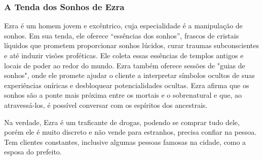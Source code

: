 



\subsubsection{A Tenda dos Sonhos de Ezra}

Ezra é um homem jovem e excêntrico, cuja especialidade é a manipulação de sonhos. Em sua tenda, ele oferece “essências dos sonhos”, frascos de cristais líquidos que prometem proporcionar sonhos lúcidos, curar traumas subconscientes e até induzir visões proféticas. Ele coleta essas essências de templos antigos e locais de poder ao redor do mundo. Ezra também oferece sessões de "guias de sonhos", onde ele promete ajudar o cliente a interpretar símbolos ocultos de suas experiências oníricas e desbloquear potencialidades ocultas. Ezra afirma que os sonhos são a ponte mais próxima entre os mortais e o sobrenatural e que, ao atravessá-los, é possível conversar com os espíritos dos ancestrais.

Na verdade, Ezra é um traficante de drogas, podendo se comprar tudo dele, porém ele é muito discreto e não vende para estranhos, precisa confiar na pessoa. Tem clientes constantes, inclusive algumas pessoas famosas na cidade, como a esposa do prefeito.



